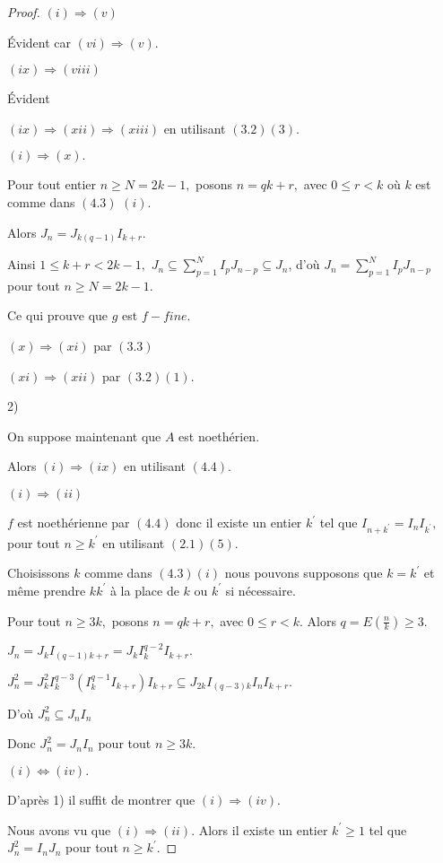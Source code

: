 \begin{proof}
	
	$(i)\Longrightarrow (v)$
	
	Évident car $(vi)\Longrightarrow (v).$
	
	$(ix)\Longrightarrow (viii)$
	
	Évident
	
	$(ix)\Longrightarrow (xii)\Longrightarrow (xiii)$ en utilisant $(3.2)(3).$
	
	$(i)\Longrightarrow (x).$
	
	Pour tout entier $n\geq N=2k-1,$ posons $n=qk+r,$ avec $0\leq r<k$ où $k$
	est comme dans $(4.3)$ $(i).$
	
	Alors $J_{n}=J_{k(q-1)}I_{k+r}.$
	
	Ainsi $1\leq k+r<2k-1,$ $J_{n}\subseteq
	\sum\limits_{p=1}^{N}I_{p}J_{n-p}\subseteq J_{n}$, d'où $J_{n}=\sum\limits_{p=1}^{N}I_{p}J_{n-p}$ pour tout $n\geq N=2k-1$.
	
	Ce qui prouve que $g$ est $f-fine.$
	
	$(x)\Longrightarrow (xi)$ par $(3.3)$
	
	$(xi)\Longrightarrow (xii)$ par $(3.2)(1).$
	
	
	2) 
	
	On suppose maintenant que $A$ est noethérien.
	
	Alors $(i)\Longrightarrow (ix)$ en utilisant $(4.4).$
	
	$(i)\Longrightarrow (ii)$
	
	$f$ est noethérienne par $(4.4)$ donc il existe un entier $k^{\prime }$ tel que $I_{n+k^{\prime }}=I_{n}I_{k^{\prime }},$ pour tout $n\geq k^{\prime }$ en utilisant $(2.1)(5).$
	
	Choisissons $k$ comme dans $(4.3)(i)$ nous pouvons supposons que $k=k^{\prime }$ et même prendre $kk^{\prime }$ \`{a} la place de $k$ ou $k^{\prime }$ si nécessaire.
	
	Pour tout $n\geq 3k,$ posons $n=qk+r,$ avec $0\leq r<k.$ Alors $q=E(\frac{n}{k})\geq 3.$
	
	$J_{n}=J_{k}I_{(q-1)k+r}=J_{k}I_{k}^{q-2}I_{k+r}.$
	
	$J_{n}^{2}=J_{k}^{2}I_{k}^{q-3}(I_{k}^{q-1}I_{k+r})I_{k+r}\subseteq J_{2k}I_{(q-3)k}I_{n}I_{k+r}.$
	
	D'où $J_{n}^{2}\subseteq J_{n}I_{n}$
	
	Donc $J_{n}^{2}=J_{n}I_{n}$ pour tout $n\geq 3k.$
	
	$(i)\Longleftrightarrow (iv).$ 
	
	D'après 1) il suffit de montrer que $(i)\Longrightarrow (iv).$
	
	Nous avons vu que $(i)\Longrightarrow (ii).$ Alors il existe un entier $%
	k^{\prime }\geq 1$ tel que $J_{n}^{2}=I_{n}J_{n}$ pour tout $n\geq k^{\prime}.$
	

\end{proof}
